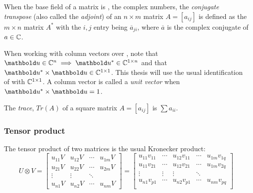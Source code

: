 When the base field of a matrix is \complex, the complex numbers,
the \emph{conjugate transpose} (also called the \emph{adjoint})
of  an $n\times m$ matrix $A=[a_{ij}]$ is defined
as the $m\times n$ matrix
$A^{*}$ with
the $i,j$ entry being $\overline{a}_{ji}$,
where  $\overline{a}$ is the complex conjugate of $a\in\mathbb{C}$.

When working with column vectors over \complex, note that
$\vc{u} \in \complex^n \implies \vc{u}^{*} \in
\complex^{1\times n}$ and that
 $\vc{u}^{*}\times \vc{u} \in \complex^{1\times 1}$.
This thesis will use the usual identification of
\complex{} with $\mathbb{C}^{1\times1}$. A column
vector  is called a \emph{unit vector}
when $\vc{u}^{*}\times \vc{u} = 1$.

\begin{definition}[Trace]
The \emph{trace}, $Tr(A)$ of a square matrix $A=[a_{ij}]$ is $\sum a_{ii}$.
\end{definition}



\subsubsection{Tensor product}
The tensor product of two matrices is the usual Kronecker product:
\[U\otimes V =
\begin{bmatrix}
u_{11}V&u_{12}V & \cdots &u_{1m}V\\
u_{21}V&u_{22}V & \cdots &u_{2m}V \\
\vdots&\vdots&\ddots\\
u_{n1}V&u_{n2}V & \cdots &u_{nm}V
\end{bmatrix}
=
\begin{bmatrix}
u_{11}v_{11}&\cdots&u_{12}v_{11} & \cdots& u_{1m}v_{1q} \\
u_{11}v_{21}&\cdots&u_{12}v_{21} & \cdots& u_{1m}v_{2q} \\
\vdots&\vdots&\vdots&\ddots \\
u_{n1}v_{p1}&\cdots&u_{n2}v_{p1} & \cdots& u_{nm}v_{pq} \\
\end{bmatrix}
\]

